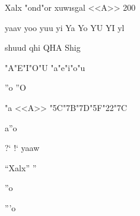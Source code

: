 \documentclass{article}
\begin{document}
{\mnr Xalx "ond"or xuw\i sgal <<A>> 200 \MyTogrog\ \No}

{\mnr yaav yoo yuu yi Ya Yo YU YI yl}

{\mnr shuud qhi QHA Shig}

{\mnr "A"E"I"O"U "a"e"i"o"u}

{\mnr ''o ''O}

{\mnr\ttfamily "a <<A>> \char"5C\char"7B\char"7D\char"5F\char"22\char"7C}

a''{\mnr o}

{\mnr ?` !` yaaw}

{\mnr ``Xalx'' ''}

{\mnr ''}o

{\mnr '''o}
\end{document}
